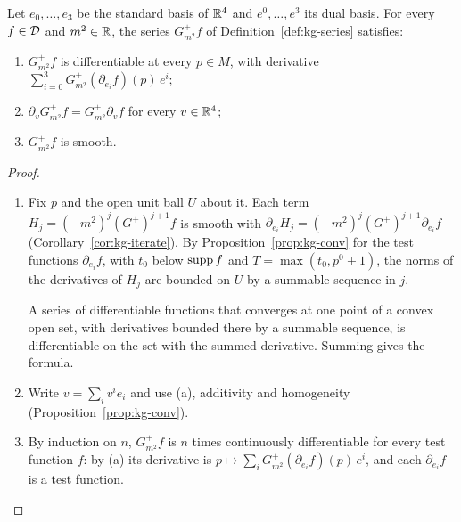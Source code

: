 \begin{proposition}\label{prop:kg-smooth}
Let $e_0,\dots,e_3$ be the standard basis of $\mathbb R^4$ and $e^0,\dots,e^3$ its dual basis. For every
$f\in\mathcal D$ and $m^2\in\mathbb R$, the series $G^+_{m^2}f$ of Definition~\ref{def:kg-series} satisfies:
\begin{enumerate}[label=(\alph*),leftmargin=2.5em]
\item $G^+_{m^2}f$ is differentiable at every $p\in M$, with derivative
$\sum_{i=0}^3G^+_{m^2}(\partial_{e_i}f)(p)\,e^i$;
\item $\partial_vG^+_{m^2}f=G^+_{m^2}\partial_vf$ for every $v\in\mathbb R^4$;
\item $G^+_{m^2}f$ is smooth.
\end{enumerate}
\end{proposition}
\begin{proof}
\begin{enumerate}[leftmargin=2.5em]
\item[(a)] Fix $p$ and the open unit ball $U$ about it. Each term $H_j=(-m^2)^j(G^+)^{j+1}f$ is
smooth with $\partial_{e_i}H_j=(-m^2)^j(G^+)^{j+1}\partial_{e_i}f$ (Corollary~\ref{cor:kg-iterate}). By
Proposition~\ref{prop:kg-conv} for the test functions $\partial_{e_i}f$, with $t_0$ below $\operatorname{supp} f$
and $T=\max(t_0,p^0+1)$, the norms of the derivatives of $H_j$ are bounded on $U$ by a summable
sequence in $j$.

A series of differentiable functions that converges at one point of a convex open set, with
derivatives bounded there by a summable sequence, is differentiable on the set with the summed
derivative. Summing gives the formula.
\item[(b)] Write $v=\sum_iv^ie_i$ and use (a), additivity and homogeneity
(Proposition~\ref{prop:kg-conv}).
\item[(c)] By induction on $n$, $G^+_{m^2}f$ is $n$ times continuously differentiable for every test
function $f$: by (a) its derivative is $p\mapsto\sum_iG^+_{m^2}(\partial_{e_i}f)(p)\,e^i$, and each
$\partial_{e_i}f$ is a test function.
\end{enumerate}
\end{proof}

